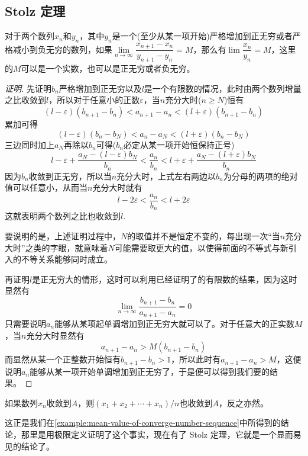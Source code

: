 \subsection{Stolz 定理}
\label{sec:stolz-theorem}

\begin{theorem}[Stolz 定理]
  对于两个数列$x_n$和$y_n$，其中$y_n$是一个(至少从某一项开始)严格增加到正无穷或者严格减小到负无穷的数列，如果$\lim\limits_{n\to\infty}\dfrac{x_{n+1}-x_n}{y_{n+1}-y_n} = M$，那么有$\lim\limits \dfrac{x_n}{y_n} = M$，这里的$M$可以是一个实数，也可以是正无穷或者负无穷。
\end{theorem}

\begin{proof}[证明]
  先证明$b_n$严格增加到正无穷以及$l$是一个有限数的情况，此时由两个数列增量之比收敛到$l$，所以对于任意小的正数$\varepsilon$，当$n$充分大时($n \geqslant N$)恒有
  \[ (l-\varepsilon)(b_{n+1}-b_n) < a_{n+1}-a_n < (l+\varepsilon)(b_{n+1}-b_n) \]
  累加可得
  \[ (l-\varepsilon)(b_{n}-b_N) < a_{n}-a_N < (l+\varepsilon)(b_{n}-b_N) \]
  三边同时加上$a_N$再除以$b_n$可得($b_n$必定从某一项开始恒保持正号)
  \[ l-\varepsilon+\frac{a_N-(l-\varepsilon)b_N}{b_n} < \frac{a_n}{b_n} < l+\varepsilon+\frac{a_N-(l+\varepsilon)b_N}{b_n}\]
  因为$b_n$收敛到正无穷，所以当$n$充分大时，上式左右两边以$b_n$为分母的两项的绝对值可以任意小，从而当$n$充分大时就有
  \[ l-2\varepsilon < \frac{a_n}{b_n} < l + 2\varepsilon \]
  这就表明两个数列之比也收敛到$l$.

  要说明的是，上述证明过程中，$N$的取值并不是恒定不变的，每出现一次“当$n$充分大时”之类的字眼，就意味着$N$可能需要取更大的值，以使得前面的不等式与新引入的不等关系能够同时成立。

  再证明$l$是正无穷大的情形，这时可以利用已经证明了的有限数的结果，因为这时显然有
  \[ \lim_{n \to \infty} \frac{b_{n+1}-b_n}{a_{n+1}-a_n} = 0 \]
  只需要说明$a_n$能够从某项起单调增加到正无穷大就可以了。对于任意大的正实数$M$，当$n$充分大时显然有
  \[ a_{n+1}-a_n > M(b_{n+1}-b_n) \]
  而显然从某一个正整数开始恒有$b_{n+1}-b_n>1$，所以此时有$a_{n+1}-a_n>M$，这便说明$a_n$能够从某一项开始单调增加到正无穷了，于是便可以得到我们要的结果。
\end{proof}

\begin{inference}
  如果数列$x_n$收敛到$A$，则$(x_1+x_2+\cdots+x_n)/n$也收敛到$A$，反之亦然。
\end{inference}

这正是我们在\autoref{example:mean-value-of-converge-number-sequence}中所得到的结论，那里是用极限定义证明了这个事实，现在有了 Stolz 定理，它就是一个显而易见的结论了。

